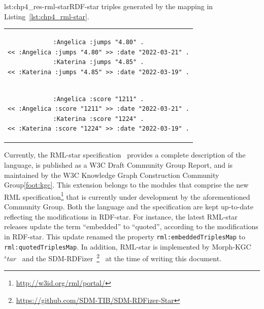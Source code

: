 \noindent\hspace{0.1\linewidth}\begin{minipage}{\linewidth}
\begin{captionedlisting}{lst:chp4_res-rml-star}{RDF-star triples generated by the mapping in Listing~\ref{lst:chp4_rml-star}.}
\centering
\begin{tabular}{c}
\hspace{2em}
{\begin{lstlisting}[basicstyle=\ttfamily\small,label={list:example1},columns=flexible]
:Angelica :jumps "4.80" .
<< :Angelica :jumps "4.80" >> :date "2022-03-21" .
:Katerina :jumps "4.85" .
<< :Katerina :jumps "4.85" >> :date "2022-03-19" .
\end{lstlisting}}\\
\hspace{2em}
{\begin{lstlisting}[basicstyle=\ttfamily\small,label={list:example1},columns=flexible,frame=l,rulecolor=\color{red},framerule=0.75pt,firstnumber=5]
:Angelica :score "1211" .
<< :Angelica :score "1211" >> :date "2022-03-21" .
:Katerina :score "1224" .
<< :Katerina :score "1224" >> :date "2022-03-19" .
\end{lstlisting}}

\end{tabular}
\end{captionedlisting}
\end{minipage}


Currently, the \mbox{RML-star} specification~\parencite{iglesias2022rmlstar} provides a complete description of the language, is published as a W3C Draft Community Group Report, and is maintained by the W3C Knowledge Graph Construction Community Group\cref{foot:kgc}. 
This extension belongs to the modules that comprise the new RML specification\footnote{\label{foot:rml-portal}\url{http://w3id.org/rml/portal/}} that is currently under development by the aforementioned Community Group. 
Both the language and the specification are kept up-to-date reflecting the modifications in \mbox{RDF-star}.
For instance, the latest \mbox{RML-star} releases update the term ``embedded'' to ``quoted'',
according to the modifications in \mbox{RDF-star}.
This update renamed the property \texttt{rml:embeddedTriplesMap} to \texttt{rml:quotedTriplesMap}.
In addition, RML-star is implemented by Morph-KGC$^star$~\parencite{arenas2023morphstar} and the SDM-RDFizer~\footnote{\url{https://github.com/SDM-TIB/SDM-RDFizer-Star}}~\parencite{iglesias2020rdfizer} at the time of writing this document.





